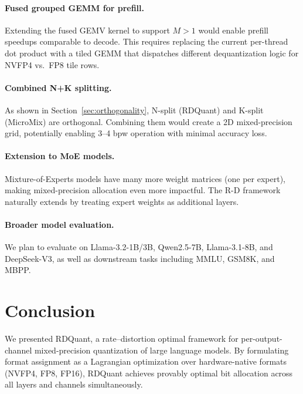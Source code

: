 \documentclass{article}
\begin{document}
\paragraph{Fused grouped GEMM for prefill.}
Extending the fused GEMV kernel to support $M > 1$ would enable prefill speedups comparable to decode.
This requires replacing the current per-thread dot product with a tiled GEMM that dispatches different dequantization logic for NVFP4 vs.\ FP8 tile rows.

\paragraph{Combined N+K splitting.}
As shown in Section~\ref{sec:orthogonality}, N-split (RDQuant) and K-split (MicroMix) are orthogonal.
Combining them would create a 2D mixed-precision grid, potentially enabling 3--4 bpw operation with minimal accuracy loss.

\paragraph{Extension to MoE models.}
Mixture-of-Experts models have many more weight matrices (one per expert), making mixed-precision allocation even more impactful.
The R-D framework naturally extends by treating expert weights as additional layers.

\paragraph{Broader model evaluation.}
We plan to evaluate on Llama-3.2-1B/3B, Qwen2.5-7B, Llama-3.1-8B, and DeepSeek-V3, as well as downstream tasks including MMLU, GSM8K, and MBPP.

\section{Conclusion}
\label{sec:conclusion}

We presented RDQuant, a rate--distortion optimal framework for per-output-channel mixed-precision quantization of large language models.
By formulating format assignment as a Lagrangian optimization over hardware-native formats (NVFP4, FP8, FP16), RDQuant achieves provably optimal bit allocation across all layers and channels simultaneously.
\end{document}
